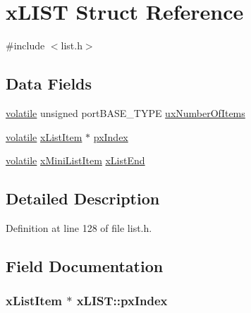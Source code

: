 \hypertarget{structx_l_i_s_t}{\section{x\-L\-I\-S\-T Struct Reference}
\label{structx_l_i_s_t}
}


{\ttfamily \#include $<$list.\-h$>$}

\subsection*{Data Fields}
\begin{DoxyCompactItemize}
\item 
\hyperlink{group___c_m_s_i_s___core___instruction_interface_gad7d93af13046b0378601b85c8c16673b}{volatile} unsigned port\-B\-A\-S\-E\-\_\-\-T\-Y\-P\-E \hyperlink{structx_l_i_s_t_a4bcd10c0f3cdeb77ef08dac16bdd6571}{ux\-Number\-Of\-Items}
\item 
\hyperlink{group___c_m_s_i_s___core___instruction_interface_gad7d93af13046b0378601b85c8c16673b}{volatile} \hyperlink{_common_2_libraries_2_free_r_t_o_s_2_source_2include_2list_8h_abc3e65a10b5c5f39142e64e69311797f}{x\-List\-Item} $\ast$ \hyperlink{structx_l_i_s_t_a9d3812d04e4f8318858a2c4b34be605a}{px\-Index}
\item 
\hyperlink{group___c_m_s_i_s___core___instruction_interface_gad7d93af13046b0378601b85c8c16673b}{volatile} \hyperlink{_common_2_libraries_2_free_r_t_o_s_2_source_2include_2list_8h_a9fb3b8c76f89efd6b8787f66e94ba04c}{x\-Mini\-List\-Item} \hyperlink{structx_l_i_s_t_a62e557ea0367c5c644136997a32c94d5}{x\-List\-End}
\end{DoxyCompactItemize}


\subsection{Detailed Description}


Definition at line 128 of file list.\-h.



\subsection{Field Documentation}
\hypertarget{structx_l_i_s_t_a9d3812d04e4f8318858a2c4b34be605a}{
\subsubsection[{px\-Index}]{ {\bf x\-List\-Item} $\ast$ x\-L\-I\-S\-T\-::px\-Index}}\label{structx_l_i_s_t_a9d3812d04e4f8318858a2c4b34be605a}


